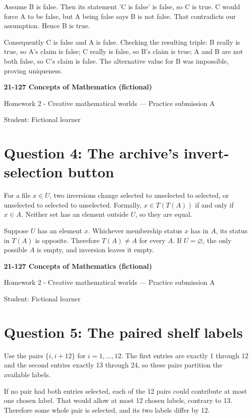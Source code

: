 \documentclass[11pt]{article}
\begin{document}
Assume B is false. Then its statement 'C is false' is false, so C is true. C would force A to be false, but A being false says B is not false. That contradicts our assumption. Hence B is true.

Consequently C is false and A is false. Checking the resulting triple: B really is true, so A's claim is false; C really is false, so B's claim is true; A and B are not both false, so C's claim is false. The alternative value for B was impossible, proving uniqueness.

\newpage
\textbf{21-127 Concepts of Mathematics (fictional)}

Homework 2 - Creative mathematical worlds --- Practice submission A

Student: Fictional learner

\section*{Question 4: The archive's invert-selection button}

For a file $x\in U$, two inversions change selected to unselected to selected, or unselected to selected to unselected. Formally, $x\in T(T(A))$ if and only if $x\in A$. Neither set has an element outside $U$, so they are equal.

Suppose $U$ has an element $x$. Whichever membership status $x$ has in $A$, its status in $T(A)$ is opposite. Therefore $T(A)\neq A$ for every $A$. If $U=\varnothing$, the only possible $A$ is empty, and inversion leaves it empty.

\newpage
\textbf{21-127 Concepts of Mathematics (fictional)}

Homework 2 - Creative mathematical worlds --- Practice submission A

Student: Fictional learner

\section*{Question 5: The paired shelf labels}

Use the pairs $\{i,i+12\}$ for $i=1,\ldots,12$. The first entries are exactly 1 through 12 and the second entries exactly 13 through 24, so these pairs partition the available labels.

If no pair had both entries selected, each of the 12 pairs could contribute at most one chosen label. That would allow at most 12 chosen labels, contrary to 13. Therefore some whole pair is selected, and its two labels differ by 12.
\end{document}

